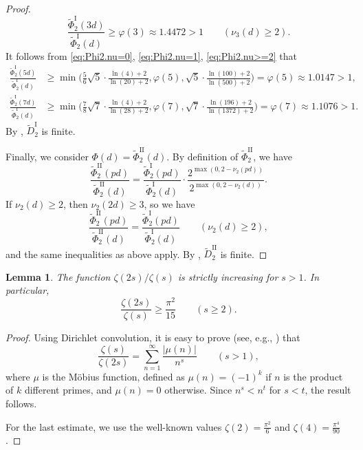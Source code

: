 \documentclass[a4paper]{amsart}
\theoremstyle{definition}
\theoremstyle{plain}
\newtheorem{lemma}[definition]{Lemma}
\newcommand{\I}{\mathrm{I}}
\newcommand{\II}{\mathrm{II}}
\begin{document}
\begin{proof}
    \[
        \frac{\tilde{\Phi}_2^\I(3d)}{\tilde{\Phi}_2^\I(d)} \geq \varphi(3) \approx 1.4472 > 1 \qquad (\nu_3(d) \geq 2).
    \]
    It follows from \eqref{eq:Phi2.nu=0}, \eqref{eq:Phi2.nu=1}, \eqref{eq:Phi2.nu>=2} that
    \begin{align*}
        \frac{\tilde{\Phi}_2^\I(5d)}{\tilde{\Phi}_2^\I(d)} & \geq \min\bigg(\frac{5}{6} \sqrt{5} \cdot \frac{\ln(4)+2}{\ln(20)+2}, \varphi(5), \sqrt{5} \cdot \frac{\ln(100)+2}{\ln(500)+2} \bigg) = \varphi(5) \approx 1.0147 >1, \\
        \frac{\tilde{\Phi}_2^\I(7d)}{\tilde{\Phi}_2^\I(d)} & \geq \min\bigg(\frac{7}{8} \sqrt{7} \cdot \frac{\ln(4)+2}{\ln(28)+2}, \varphi(7), \sqrt{7} \cdot \frac{\ln(196)+2}{\ln(1372)+2} \bigg) = \varphi(7) \approx 1.1076 >1.
    \end{align*}
    By , \(\tilde{D}_2^\I\) is finite.

    Finally, we consider \(\Phi(d) = \tilde{\Phi}_2^\II(d)\). By definition of \(\tilde{\Phi}_2^\II\), we have  
    \[
        \frac{\tilde{\Phi}_2^\II(pd)}{\tilde{\Phi}_2^\II(d)} = \frac{\tilde{\Phi}_2^\I(pd)}{\tilde{\Phi}_2^\I(d)} \cdot \frac{2^{\max(0, 2 - \nu_2(pd))}}{2^{\max(0, 2 - \nu_2(d))}}.
    \]  
    If \(\nu_2(d) \geq 2\), then \(\nu_2(2d) \geq 3\), so we have  
    \[
        \frac{\tilde{\Phi}_2^\II(pd)}{\tilde{\Phi}_2^\II(d)} = \frac{\tilde{\Phi}_2^\I(pd)}{\tilde{\Phi}_2^\I(d)} \qquad (\nu_2(d) \geq 2),
    \]  
    and the same inequalities as above apply.
    By , \(\tilde{D}_2^\II\) is finite.
\end{proof}

\begin{lemma} \label{lem:estimate.zeta}
The function \(\zeta(2s)/\zeta(s)\) is strictly increasing for \(s > 1\). 
In particular, 
\[
    \frac{\zeta(2s)}{\zeta(s)} \geq \frac{\pi^2}{15} \qquad (s \geq 2).
\]
\end{lemma}

\begin{proof}
    Using Dirichlet convolution, it is easy to prove (see, e.g., \cite[formula (4) on p. 145]{hua}) that
    \[
        \frac{\zeta(s)}{\zeta(2s)} = \sum_{n = 1}^\infty \frac{|\mu(n)|}{n^s} \qquad (s > 1),
    \]
    where \(\mu\) is the Möbius function, defined as \(\mu(n) = (-1)^k\) if \(n\) is the product of \(k\) different primes, and \(\mu(n) = 0\) otherwise. Since \(n^s < n^t\) for \(s < t\), the result follows.
    
    For the last estimate, we use the well-known values \(\zeta(2) = \frac{\pi^2}{6}\) and \(\zeta(4) = \frac{\pi^4}{90}\). 
\end{proof}
\end{document}
